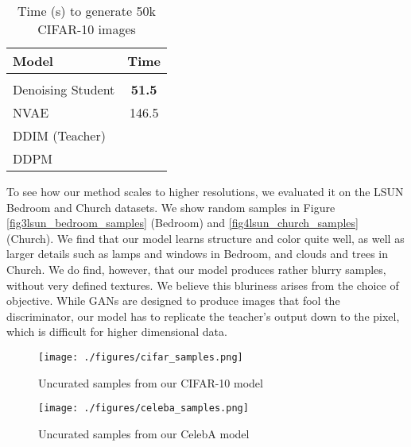 \documentclass[12pt,a4paper]{article}
\begin{document}
\begin{table}[t!]
{  }
  \hfill
  \parbox{.3\linewidth}{
  	\begin{small}
    \caption{Time (s) to generate 50k CIFAR-10 images} 
    \label{tab:table2}
    \begin{tabular}{l|c} 
      \\
      Model & Time\\
      \hline \\
      Denoising Student & \textbf{51.5} \\
      NVAE  & 146.5 \\
      DDIM (Teacher)  &  \\
      DDPM & 
    \end{tabular}
    \end{small}
  }
\end{table}

To see how our method scales to higher resolutions, we evaluated it on the  LSUN Bedroom and Church datasets. We show random samples in Figure \ref{fig3lsun_bedroom_samples} (Bedroom) and \ref{fig4lsun_church_samples} (Church). We find that our model learns structure and color quite well, as well as larger details such as lamps and windows in Bedroom, and clouds and trees in Church. We do find, however, that our model produces rather blurry samples, without very defined textures.  We believe this bluriness arises from the choice of objective. While GANs are designed to produce images that fool the discriminator, our model has to replicate the teacher's output down to the pixel, which is difficult for higher dimensional data.

\vspace{-0.25cm}
\begin{minipage}{0.45\linewidth} 
\begin{figure}[H]
\texttt{[image: ./figures/cifar\_samples.png]}
\caption{Uncurated samples from our CIFAR-10 model}
\label{fig1cifar_samples}
\end{figure}
\end{minipage}
\hspace{1cm}
\begin{minipage}{0.45\linewidth} 
\begin{figure}[H]
\texttt{[image: ./figures/celeba\_samples.png]}
\caption{Uncurated samples from our CelebA model}
\label{fig2celeba_samples}
\end{figure}
\end{minipage}
\end{document}
